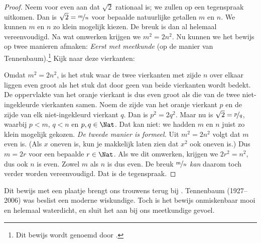\documentclass[openany]{memoir}
\begin{document}
\begin{proof}
Neem voor even aan dat $\sqrt{2}$ rationaal is; we zullen op een
tegenspraak uitkomen. Dan is $\sqrt{2} = \nicefrac{m}{n}$ voor
bepaalde natuurlijke getallen $m$ en $n$. We kunnen $m$ en $n$ zo
klein mogelijk kiezen. De breuk is dan al helemaal vereenvoudigd. Na
wat omwerken krijgen we $m^{2} = 2n^{2}$. Nu kunnen we het bewijs op twee manieren
afmaken:
\emph{Eerst met meetkunde} (op de manier van Tennenbaum).\footnote{Dit
bewijs wordt genoemd door \cite{Conway2006}.} Kijk naar deze vierkanten:
\begin{center}	
\end{center}
Omdat $m^2 = 2n^2$, is het stuk waar de twee vierkanten met zijde $n$
over elkaar liggen even groot als het stuk dat door geen van beide
vierkanten wordt bedekt. De oppervlakte van het oranje vierkant is dus
even groot als die van de twee niet-ingekleurde vierkanten samen. Noem de zijde van
het oranje vierkant $p$ en de zijde van elk niet-ingekleurd vierkant
$q$. Dan is $p^2 = 2q^2$. Maar nu is $\sqrt{2} = \nicefrac{p}{q}$,
waarbij $p < m$, $q < n$ en $p, q \in \Nat$. Dat kan niet: we hadden
$m$ en $n$ juist zo klein mogelijk gekozen.
\emph{De tweede manier is formeel.} Uit $m^{2} = 2n^{2}$
volgt dat $m$ even is. (Als $x$ oneven is, kun je makkelijk laten zien
dat $x^2$ ook oneven is.) Dus $m = 2r$ voor een bepaalde $r \in \Nat$. Als we dit
omwerken, krijgen we $2r^2 = n^2$,
dus ook $n$ is even. Zowel $m$ als $n$ is dus even. De breuk
$\nicefrac{m}{n}$ \emph{kan} daarom toch verder worden vereenvoudigd.
Dat is de tegenspraak.
\end{proof}
Dit bewijs met een plaatje brengt ons trouwens terug bij
. Tennenbaum (1927--2006) was beslist
een moderne wiskundige. Toch is het bewijs onmiskenbaar mooi en
helemaal waterdicht, en sluit het aan bij ons meetkundige gevoel.
\end{document}
